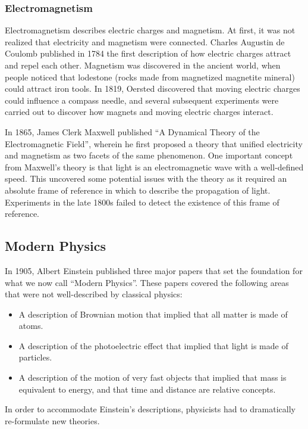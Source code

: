 \subsubsection{Electromagnetism}
Electromagnetism describes electric charges and magnetism. At first, it was not realized that electricity and magnetism were connected. Charles Augustin de Coulomb published in 1784 the first description of how electric charges attract and repel each other. Magnetism was discovered in the ancient world, when people noticed that lodestone (rocks made from magnetized magnetite mineral) could attract iron tools. In 1819, Oersted discovered that moving electric charges could influence a compass needle, and several subsequent experiments were carried out to discover how magnets and moving electric charges interact.

In 1865, James Clerk Maxwell published ``A Dynamical Theory of the Electromagnetic Field'', wherein he first proposed a theory that unified electricity and magnetism as two facets of the same phenomenon. One important concept from Maxwell's theory is that light is an electromagnetic wave with a well-defined speed. This uncovered some potential issues with the theory as it required an absolute frame of reference in which to describe the propagation of light. Experiments in the late 1800s failed to detect the existence of this frame of reference.

\subsection{Modern Physics}
In 1905, Albert Einstein published three major papers that set the foundation for what we now call ``Modern Physics''. These papers covered the following areas that were not well-described by classical physics:
\begin{itemize}
\item A description of Brownian motion that implied that all matter is made of atoms.
\item A description of the photoelectric effect that implied that light is made of particles.
\item A description of the motion of very fast objects that implied that mass is equivalent to energy, and that time and distance are relative concepts.
\end{itemize}
In order to accommodate Einstein's descriptions, physicists had to dramatically re-formulate new theories. 


